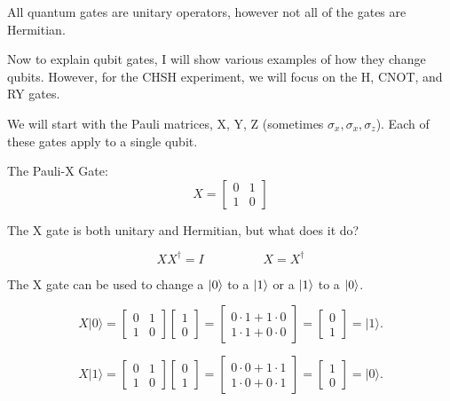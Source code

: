 \documentclass[12pt]{article}
\begin{document}
All quantum gates are unitary operators, however not all of the gates are Hermitian.

Now to explain qubit gates, I will show various examples of how they change qubits. However, for the CHSH experiment, we will focus on the H, CNOT, and RY gates.

We will start with the Pauli matrices, X, Y, Z (sometimes $\sigma_x, \sigma_x, \sigma_z$). Each of these gates apply to a single qubit.

The Pauli-X Gate:
$$
X = \begin{bmatrix}
0 & 1 \\
1 & 0
\end{bmatrix}
$$

The X gate is both unitary and Hermitian, but what does it do?

$$
XX^\dagger = I \hspace{2cm} X = X^\dagger
$$


The X gate can be used to change a $\ket{0}$ to a $\ket{1}$ or a $\ket{1}$ to a $\ket{0}$. 



$$
X \vert 0 \rangle = 
\begin{bmatrix} 0 & 1 \\ 1 & 0 \end{bmatrix}
\begin{bmatrix} 1 \\ 0 \end{bmatrix}
=
\begin{bmatrix} 0\cdot1 + 1\cdot0 \\ 1\cdot1 + 0\cdot0 \end{bmatrix}
=
\begin{bmatrix} 0 \\ 1 \end{bmatrix} = \vert 1 \rangle.
$$

$$
X \vert 1 \rangle = 
\begin{bmatrix} 0 & 1 \\ 1 & 0 \end{bmatrix}
\begin{bmatrix} 0 \\ 1 \end{bmatrix}
=
\begin{bmatrix} 0\cdot 0 + 1\cdot 1 \\ 1\cdot 0 + 0\cdot 1 \end{bmatrix}
=
\begin{bmatrix} 1 \\ 0 \end{bmatrix}
= \vert 0 \rangle.
$$
\end{document}
